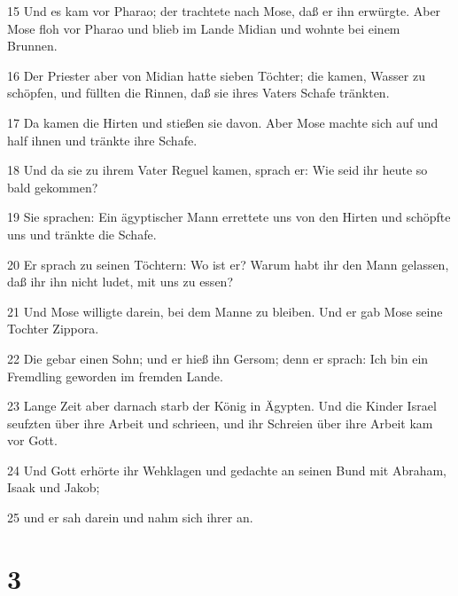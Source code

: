 \par 15 Und es kam vor Pharao; der trachtete nach Mose, daß er ihn erwürgte. Aber Mose floh vor Pharao und blieb im Lande Midian und wohnte bei einem Brunnen.
\par 16 Der Priester aber von Midian hatte sieben Töchter; die kamen, Wasser zu schöpfen, und füllten die Rinnen, daß sie ihres Vaters Schafe tränkten.
\par 17 Da kamen die Hirten und stießen sie davon. Aber Mose machte sich auf und half ihnen und tränkte ihre Schafe.
\par 18 Und da sie zu ihrem Vater Reguel kamen, sprach er: Wie seid ihr heute so bald gekommen?
\par 19 Sie sprachen: Ein ägyptischer Mann errettete uns von den Hirten und schöpfte uns und tränkte die Schafe.
\par 20 Er sprach zu seinen Töchtern: Wo ist er? Warum habt ihr den Mann gelassen, daß ihr ihn nicht ludet, mit uns zu essen?
\par 21 Und Mose willigte darein, bei dem Manne zu bleiben. Und er gab Mose seine Tochter Zippora.
\par 22 Die gebar einen Sohn; und er hieß ihn Gersom; denn er sprach: Ich bin ein Fremdling geworden im fremden Lande.
\par 23 Lange Zeit aber darnach starb der König in Ägypten. Und die Kinder Israel seufzten über ihre Arbeit und schrieen, und ihr Schreien über ihre Arbeit kam vor Gott.
\par 24 Und Gott erhörte ihr Wehklagen und gedachte an seinen Bund mit Abraham, Isaak und Jakob;
\par 25 und er sah darein und nahm sich ihrer an.

\chapter{3}

